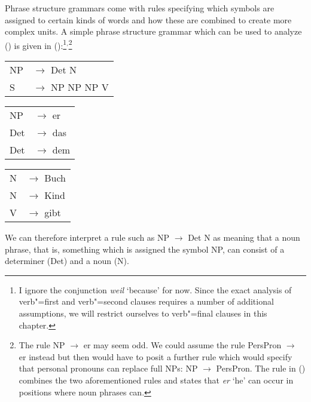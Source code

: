 Phrase structure grammars come with rules specifying which symbols are assigned to certain kinds of words and how these are combined to create more
complex units. A simple phrase structure grammar which can be used to analyze () is given in ():\footnote{%
	I ignore the conjunction \emph{weil} `because' for now. Since the exact analysis of
         verb"=first and verb"=second clauses requires a number of additional assumptions, we will restrict ourselves to verb"=final clauses in this chapter.
}$^,$\footnote{\label{fn-np-pron-ps-rule}%
	The rule NP $\to$ er may seem odd. We could assume the rule PersPron $\to$ er instead but then would have to posit a further rule which
	would specify that personal pronouns can replace full NPs: NP $\to$ PersPron. The rule in () combines the two aforementioned rules and states
	that \emph{er} `he' can occur in positions where noun phrases can.
}
\ea
\label{bsp-grammatik-psg}
\begin{tabular}[t]{@{}l@{ }l}
{NP} & {$\to$ Det N}\\          
{S}  & {$\to$ NP NP NP V}
\end{tabular}\hspace{2cm}%
\begin{tabular}[t]{@{}l@{ }l}
{NP} & {$\to$ er}\\
{Det}  & {$\to$ das}\\
{Det}  & {$\to$ dem}\\
\end{tabular}\hspace{8mm}
\begin{tabular}[t]{@{}l@{ }l}
{N} & {$\to$ Buch}\\
{N} & {$\to$ Kind}\\
{V} & {$\to$ gibt}\\
\end{tabular}
\z
We can therefore interpret a rule such as NP $\to$\is{$\to$} Det N as meaning that a noun phrase, that is, something which is assigned the symbol NP, can consist
of a determiner (Det) and a noun (N).

